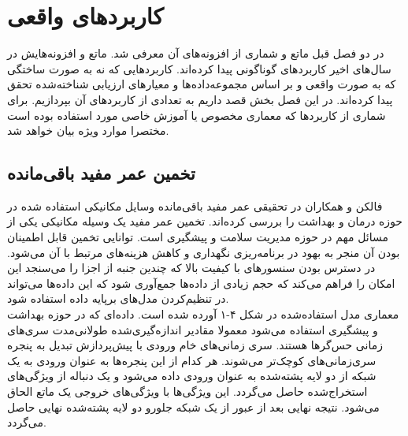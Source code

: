 \chapter{کاربردهای واقعی}
در دو فصل قبل ماتع و شماری از افزونه‌های آن معرفی شد. ماتع و افزونه‌هایش در سال‌های اخیر کاربردهای گوناگونی پیدا کرده‌اند. کاربردهایی که نه به صورت ساختگی که به صورت واقعی و بر اساس مجموعه‌داده‌ها و معیارهای ارزیابی شناخته‌شده تحقق پیدا کرده‌اند. در این فصل بخش قصد داریم به تعدادی از کاربردهای آن بپردازیم. برای شماری از کاربردها که معماری مخصوص یا آموزش خاصی مورد استفاده بوده است مختصرا موارد ویژه بیان خواهد شد.

\section{تخمین عمر مفید باقی‌مانده}
فالکن و همکاران در تحقیقی عمر مفید باقی‌مانده وسایل مکانیکی استفاده شده در حوزه درمان و بهداشت را بررسی کرده‌اند. تخمین عمر مفید یک وسیله مکانیکی یکی از مسائل مهم در حوزه مدیریت سلامت و پیشگیری است. توانایی تخمین قابل اطمینان بودن آن منجر به بهود در برنامه‌ریزی نگهداری و کاهش هزینه‌های مرتبط با آن می‌شود. در دسترس بودن سنسورهای با کیفیت بالا که چندین جنبه از اجزا را می‌سنجد این امکان را فراهم می‌کند که حجم زیادی از داده‌ها جمع‌آوری شود که این داده‌ها می‌تواند در تنظیم‌کردن مدل‌های برپایه داده استفاده شود.\cite{falcon2020neural}
\\

معماری مدل استفاده‌شده در شکل ۴-۱ آورده شده است. داده‌ای که در حوزه بهداشت و پیشگیری استفاده می‌شود معمولا مقادیر اندازه‌گیری‌شده طولانی‌مدت سری‌های زمانی حس‌گرها هستند. 
سری زمانی‌های خام ورودی با پیش‌پردازش تبدیل به پنجره سری‌زمانی‌های کوچک‌تر می‌شوند. هر کدام از این پنجره‌ها به عنوان ورودی به یک شبکه از دو لایه پشته‌شده  به عنوان ورودی داده می‌شود و یک دنباله از ویژگی‌های استخراج‌شده حاصل می‌گردد. این ویژگی‌ها با ویژگی‌های خروجی یک ماتع الحاق می‌شود. نتیجه نهایی بعد از عبور از یک شبکه جلورو دو لایه پشته‌شده نهایی حاصل می‌گردد.\cite{falcon2020neural}
\\

